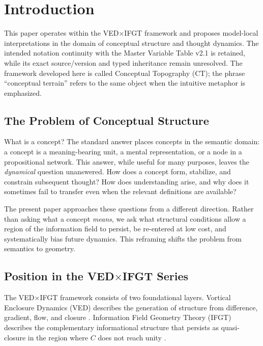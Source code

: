 
\section{Introduction}
\label{sec:introduction}

This paper operates within the VED$\times$IFGT framework
\citep{VED_vol1, IFGT} and proposes model-local interpretations in the
domain of conceptual structure and thought dynamics.
The intended notation continuity with the Master Variable Table v2.1 is
retained, while its exact source/version and typed inheritance remain unresolved.
The framework developed here is called Conceptual Topography (CT);
the phrase ``conceptual terrain'' refers to the same object when the
intuitive metaphor is emphasized.

\subsection{The Problem of Conceptual Structure}

What is a concept?
The standard answer places concepts in the semantic domain:
a concept is a meaning-bearing unit, a mental representation,
or a node in a propositional network.
This answer, while useful for many purposes, leaves the
\emph{dynamical} question unanswered.
How does a concept form, stabilize, and constrain subsequent thought?
How does understanding arise, and why does it sometimes fail to transfer
even when the relevant definitions are available?

The present paper approaches these questions from a different direction.
Rather than asking what a concept \emph{means}, we ask what structural
conditions allow a region of the information field to persist, be
re-entered at low cost, and systematically bias future dynamics.
This reframing shifts the problem from semantics to geometry.

\subsection{Position in the \texorpdfstring{VED$\times$IFGT}{VED x IFGT} Series}

The VED$\times$IFGT framework consists of two foundational layers.
Vortical Enclosure Dynamics (VED) describes the generation of structure
from difference, gradient, flow, and closure \citep{VED_vol1}.
Information Field Geometry Theory (IFGT) describes the complementary
informational structure that persists as quasi-closure in the region
where $C$ does not reach unity \citep{IFGT}.

